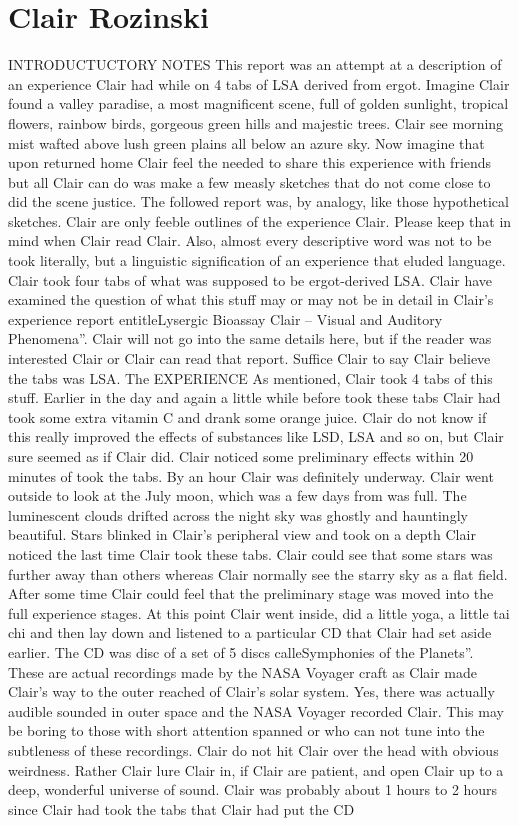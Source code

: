 \documentclass[12pt]{book}
\begin{document}
\chapter{Clair Rozinski}

INTRODUCTUCTORY NOTES This report was an attempt at a description of an experience Clair had while on 4 tabs of LSA derived from ergot. Imagine Clair found a valley paradise, a most magnificent scene, full of golden sunlight, tropical flowers, rainbow birds, gorgeous green hills and majestic trees. Clair see morning mist wafted above lush green plains all below an azure sky. Now imagine that upon returned home Clair feel the needed to share this experience with friends but all Clair can do was make a few measly sketches that do not come close to did the scene justice. The followed report was, by analogy, like those hypothetical sketches. Clair are only feeble outlines of the experience Clair. Please keep that in mind when Clair read Clair. Also, almost every descriptive word was not to be took literally, but a linguistic signification of an experience that eluded language. Clair took four tabs of what was supposed to be ergot-derived LSA. Clair have examined the question of what this stuff may or may not be in detail in Clair's experience report entitleLysergic Bioassay Clair -- Visual and Auditory Phenomena''. Clair will not go into the same details here, but if the reader was interested Clair or Clair can read that report. Suffice Clair to say Clair believe the tabs was LSA. The EXPERIENCE As mentioned, Clair took 4 tabs of this stuff. Earlier in the day and again a little while before took these tabs Clair had took some extra vitamin C and drank some orange juice. Clair do not know if this really improved the effects of substances like LSD, LSA and so on, but Clair sure seemed as if Clair did. Clair noticed some preliminary effects within 20 minutes of took the tabs. By an hour Clair was definitely underway. Clair went outside to look at the July moon, which was a few days from was full. The luminescent clouds drifted across the night sky was ghostly and hauntingly beautiful. Stars blinked in Clair's peripheral view and took on a depth Clair noticed the last time Clair took these tabs. Clair could see that some stars was further away than others whereas Clair normally see the starry sky as a flat field. After some time Clair could feel that the preliminary stage was moved into the full experience stages. At this point Clair went inside, did a little yoga, a little tai chi and then lay down and listened to a particular CD that Clair had set aside earlier. The CD was disc of a set of 5 discs calleSymphonies of the Planets''. These are actual recordings made by the NASA Voyager craft as Clair made Clair's way to the outer reached of Clair's solar system. Yes, there was actually audible sounded in outer space and the NASA Voyager recorded Clair. This may be boring to those with short attention spanned or who can not tune into the subtleness of these recordings. Clair do not hit Clair over the head with obvious weirdness. Rather Clair lure Clair in, if Clair are patient, and open Clair up to a deep, wonderful universe of sound. Clair was probably about 1  hours to 2 hours since Clair had took the tabs that Clair had put the CD 
\end{document}
